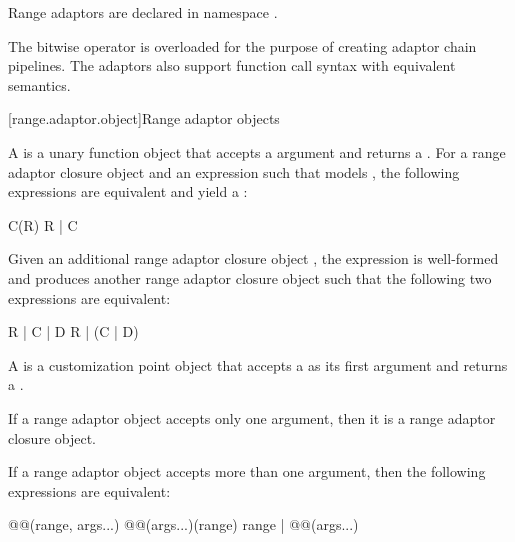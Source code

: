 \pnum
Range adaptors are declared in namespace .

\pnum
The bitwise  operator is overloaded for the purpose of creating adaptor chain
pipelines. The adaptors also support function call syntax with equivalent
semantics.

\pnum
\begin{example}
\end{example}

[range.adaptor.object]{Range adaptor objects}

\pnum
A  is a unary function object that accepts
a  argument and returns a . For
a range adaptor closure object  and an expression  such that
 models , the following
expressions are equivalent and yield a :

\begin{codeblock}
C(R)
R | C
\end{codeblock}

Given an additional range adaptor closure object ,
the expression  is well-formed and produces another range adaptor
closure object such that the following two expressions are equivalent:

\begin{codeblock}
R | C | D
R | (C | D)
\end{codeblock}

\pnum
A  is a
customization point object
that accepts a  as its first argument and returns a
.

\pnum
If a range adaptor object accepts only one argument,
then it is a range adaptor closure object.

\pnum
If a range adaptor object accepts more than one argument,
then the following expressions are equivalent:

\begin{codeblock}
@@(range, args...)
@@(args...)(range)
range | @@(args...)
\end{codeblock}

